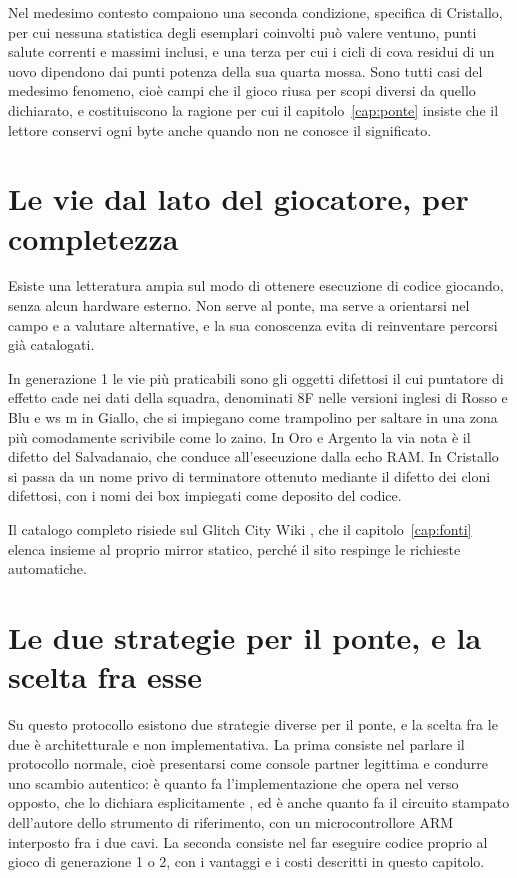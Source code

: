 Nel medesimo contesto compaiono una seconda condizione, specifica di Cristallo, per cui nessuna statistica degli esemplari coinvolti può valere ventuno, punti salute correnti e massimi inclusi, e una terza per cui i cicli di cova residui di un uovo dipendono dai punti potenza della sua quarta mossa. Sono tutti casi del medesimo fenomeno, cioè campi che il gioco riusa per scopi diversi da quello dichiarato, e costituiscono la ragione per cui il capitolo~\ref{cap:ponte} insiste che il lettore conservi ogni byte anche quando non ne conosce il significato.

\section{Le vie dal lato del giocatore, per completezza}

Esiste una letteratura ampia sul modo di ottenere esecuzione di codice giocando, senza alcun hardware esterno. Non serve al ponte, ma serve a orientarsi nel campo e a valutare alternative, e la sua conoscenza evita di reinventare percorsi già catalogati.

In generazione 1 le vie più praticabili sono gli oggetti difettosi il cui puntatore di effetto cade nei dati della squadra, denominati 8F nelle versioni inglesi di Rosso e Blu e ws m in Giallo, che si impiegano come trampolino per saltare in una zona più comodamente scrivibile come lo zaino. In Oro e Argento la via nota è il difetto del Salvadanaio, che conduce all'esecuzione dalla echo RAM. In Cristallo si passa da un nome privo di terminatore ottenuto mediante il difetto dei cloni difettosi, con i nomi dei box impiegati come deposito del codice.

Il catalogo completo risiede sul Glitch City Wiki \cite{glitchcity}, che il capitolo~\ref{cap:fonti} elenca insieme al proprio mirror statico, perché il sito respinge le richieste automatiche.

\section{Le due strategie per il ponte, e la scelta fra esse}

Su questo protocollo esistono due strategie diverse per il ponte, e la scelta fra le due è architetturale e non implementativa. La prima consiste nel parlare il protocollo normale, cioè presentarsi come console partner legittima e condurre uno scambio autentico: è quanto fa l'implementazione che opera nel verso opposto, che lo dichiara esplicitamente \cite{gen3togenx}, ed è anche quanto fa il circuito stampato dell'autore dello strumento di riferimento, con un microcontrollore ARM interposto fra i due cavi. La seconda consiste nel far eseguire codice proprio al gioco di generazione 1 o 2, con i vantaggi e i costi descritti in questo capitolo.

